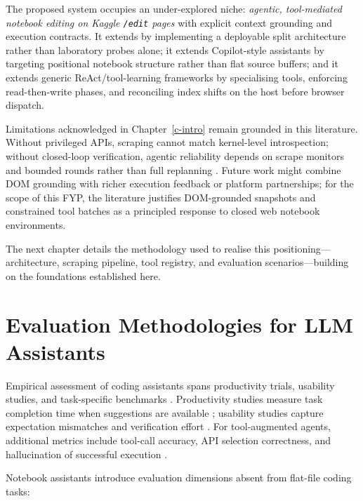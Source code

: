 The proposed system occupies an under-explored niche: \emph{agentic, tool-mediated notebook editing on Kaggle \texttt{/edit} pages} with explicit context grounding and execution contracts. It extends \textcite{mcnutt2023notebookassistants} by implementing a deployable split architecture rather than laboratory probes alone; it extends Copilot-style assistants by targeting positional notebook structure rather than flat source buffers; and it extends generic ReAct/tool-learning frameworks by specialising tools, enforcing read-then-write phases, and reconciling index shifts on the host before browser dispatch.

Limitations acknowledged in Chapter~\ref{c-intro} remain grounded in this literature. Without privileged APIs, scraping cannot match kernel-level introspection; without closed-loop verification, agentic reliability depends on scrape monitors and bounded rounds rather than full replanning \parencite{mozannar2024reading,vaithilingam2022expectation}. Future work might combine DOM grounding with richer execution feedback or platform partnerships; for the scope of this FYP, the literature justifies DOM-grounded snapshots and constrained tool batches as a principled response to closed web notebook environments.

The next chapter details the methodology used to realise this positioning---architecture, scraping pipeline, tool registry, and evaluation scenarios---building on the foundations established here.

\section{Evaluation Methodologies for LLM Assistants}
\label{sec:lit-evaluation}

Empirical assessment of coding assistants spans productivity trials, usability studies, and task-specific benchmarks \parencite{ziegler2024copilot,vaithilingam2022expectation,chen2021codex}. Productivity studies measure task completion time when suggestions are available \parencite{ziegler2024copilot}; usability studies capture expectation mismatches and verification effort \parencite{vaithilingam2022expectation,mozannar2024reading}. For tool-augmented agents, additional metrics include tool-call accuracy, API selection correctness, and hallucination of successful execution \parencite{qin2024toolllm,li2023apibank,patil2023gorilla}.

Notebook assistants introduce evaluation dimensions absent from flat-file coding tasks:

